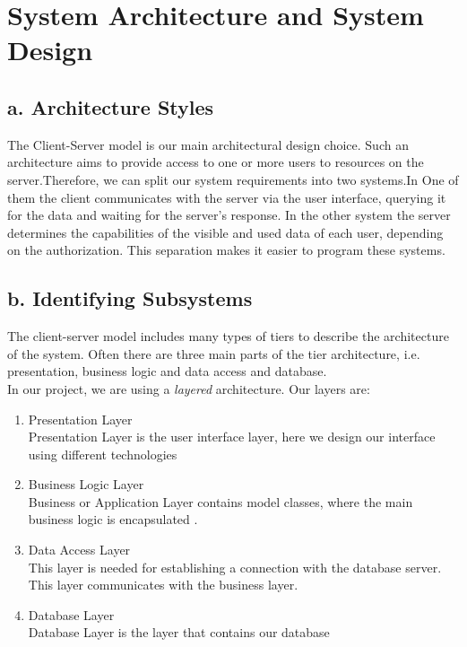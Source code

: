 \documentclass{scrartcl}
\begin{document}
	    
 
 \pagebreak	

\section{System Architecture and System Design}
\subsection{a. Architecture Styles}
The Client-Server model is our main architectural design choice. Such an architecture aims to provide access to one or more users to resources on the server.Therefore, we can split our system requirements into two systems.In One of them  the client  communicates with the server via the user interface, querying it for the data and waiting for the server's response. In the other system the server determines the capabilities of the visible and used data of each user, depending on the authorization. This separation makes it easier to program these systems.

\subsection{b. Identifying Subsystems}
The client-server model includes many types of tiers to describe the architecture of the system. Often there are three main parts of the tier architecture, i.e. presentation, business logic and data access and database. \\
In our project, we are using  a \textit{layered} architecture. Our layers are:

\begin{enumerate}
\item Presentation Layer\\
Presentation Layer is the user interface layer, here we design our interface using different technologies
\item Business Logic Layer\\
Business or Application Layer contains model classes, where the main business logic is encapsulated . 

\item Data Access Layer\\
This layer is needed for establishing a connection with the database server. This layer communicates with the business layer.
\item Database Layer\\
Database Layer is the layer  that contains our database
\end{enumerate}
\end{document}
